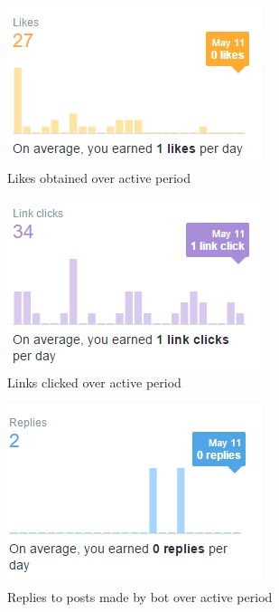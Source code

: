 \begin{figure}
\centering
\includegraphics[width=0.7\linewidth]{figures/twitter_analytics/likes}
\caption{Likes obtained over active period}
\label{fig:likes}
\end{figure}
\begin{figure}
\centering
\includegraphics[width=0.7\linewidth]{figures/twitter_analytics/linkclicks}
\caption{Links clicked over active period}
\label{fig:linkclicks}
\end{figure}
\begin{figure}
\centering
\includegraphics[width=0.7\linewidth]{figures/twitter_analytics/replies}
\caption{Replies to posts made by bot over active period}
\label{fig:replies}
\end{figure}
